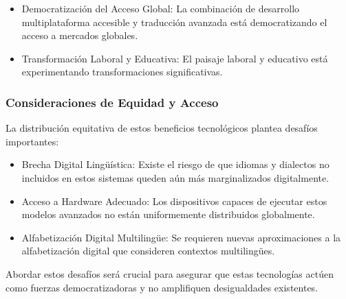 \begin{itemize}
    \item Democratización del Acceso Global: La combinación de desarrollo multiplataforma accesible y traducción avanzada está democratizando el acceso a mercados globales.
    \item Transformación Laboral y Educativa: El paisaje laboral y educativo está experimentando transformaciones significativas.
\end{itemize}

\subsubsection{Consideraciones de Equidad y Acceso}
La distribución equitativa de estos beneficios tecnológicos plantea desafíos importantes:

\begin{itemize}
    \item Brecha Digital Lingüística: Existe el riesgo de que idiomas y dialectos no incluidos en estos sistemas queden aún más marginalizados digitalmente.
    \item Acceso a Hardware Adecuado: Los dispositivos capaces de ejecutar estos modelos avanzados no están uniformemente distribuidos globalmente.
    \item Alfabetización Digital Multilingüe: Se requieren nuevas aproximaciones a la alfabetización digital que consideren contextos multilingües.
\end{itemize}

Abordar estos desafíos será crucial para asegurar que estas tecnologías actúen como fuerzas democratizadoras y no amplifiquen desigualdades existentes.